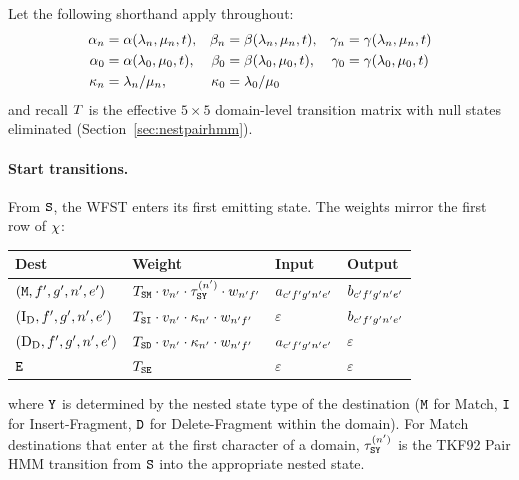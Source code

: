 Let the following shorthand apply throughout:
\begin{align*}
\alpha_n &= \alpha(\lambda_n, \mu_n, t), &
\beta_n &= \beta(\lambda_n, \mu_n, t), &
\gamma_n &= \gamma(\lambda_n, \mu_n, t) \\
\alpha_0 &= \alpha(\lambda_0, \mu_0, t), &
\beta_0 &= \beta(\lambda_0, \mu_0, t), &
\gamma_0 &= \gamma(\lambda_0, \mu_0, t) \\
\kappa_n &= \lambda_n / \mu_n, &
\kappa_0 &= \lambda_0 / \mu_0
\end{align*}
and recall $T$ is the effective $5 \times 5$ domain-level transition matrix
with null states eliminated (Section~\ref{sec:nestpairhmm}).

\paragraph{Start transitions.}
From ${\tt S}$, the WFST enters its first emitting state.
The weights mirror the first row of $\chi$:

\begin{center}
\renewcommand{\arraystretch}{1.4}
\begin{tabular}{llll}
\hline
Dest & Weight & Input & Output \\
\hline
$({\tt M}, f', g', n', e')$ &
  $T_{{\tt S}{\tt M}} \cdot v_{n'} \cdot \tau^{(n')}_{{\tt S}{\tt Y}} \cdot w_{n'f'}$ &
  $a_{c'f' g'n' e'}$ &
  $b_{c'f' g'n' e'}$ \\
$(\mathrm{I_D}, f', g', n', e')$ &
  $T_{{\tt S}{\tt I}} \cdot v_{n'} \cdot \kappa_{n'} \cdot w_{n'f'}$ &
  $\varepsilon$ &
  $b_{c'f' g'n' e'}$ \\
$(\mathrm{D_D}, f', g', n', e')$ &
  $T_{{\tt S}{\tt D}} \cdot v_{n'} \cdot \kappa_{n'} \cdot w_{n'f'}$ &
  $a_{c'f' g'n' e'}$ &
  $\varepsilon$ \\
${\tt E}$ &
  $T_{{\tt S}{\tt E}}$ &
  $\varepsilon$ & $\varepsilon$ \\
\hline
\end{tabular}
\end{center}
where ${\tt Y}$ is determined by the nested state type of the destination
(${\tt M}$ for Match, ${\tt I}$ for Insert-Fragment, ${\tt D}$ for Delete-Fragment within the domain).
For Match destinations that enter at the first character of a domain,
$\tau^{(n')}_{{\tt S}{\tt Y}}$ is the TKF92 Pair HMM transition from ${\tt S}$
into the appropriate nested state.

